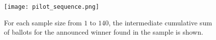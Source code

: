 \begin{figure}
\texttt{[image: pilot\_sequence.png]}
\caption{For each sample size from $1$ to $140$, the intermediate cumulative sum of ballots for the announced winner found in the sample is shown.}
\label{fig:pilot_sequence}
\end{figure}




